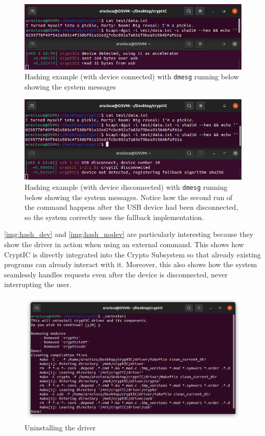 \begin{figure}[htb]
		\center
		\includegraphics[width=\textwidth]{img/hash_device.png}
		\caption{Hashing example (with device connected) with \texttt{dmesg} running below showing the system messages}
    \label{img:hash_dev}
\end{figure}
\begin{figure}[htb]
		\center
		\includegraphics[width=\textwidth]{img/hash_nodev.png}
		\caption{Hashing example (with device disconnected) with \texttt{dmesg} running below showing the system messages. Notice how the second run of the command happens after the USB device had been disconnected, so the system correctly uses the fallback implementation.}
    \label{img:hash_nodev}
\end{figure}
\autoref{img:hash_dev} and \autoref{img:hash_nodev} are particularly interesting because they show the driver in action when using an external command. This shows how CryptIC is directly integrated into the Crypto Subsystem so that already existing programs can already interact with it. Moreover, this also shows how the system seamlessly handles requests even after the device is disconnected, never interrupting the user.


\begin{figure}[htb]
		\center
		\includegraphics[width=\textwidth]{img/uninstall.png}
		\caption{Uninstalling the driver}
\end{figure}
